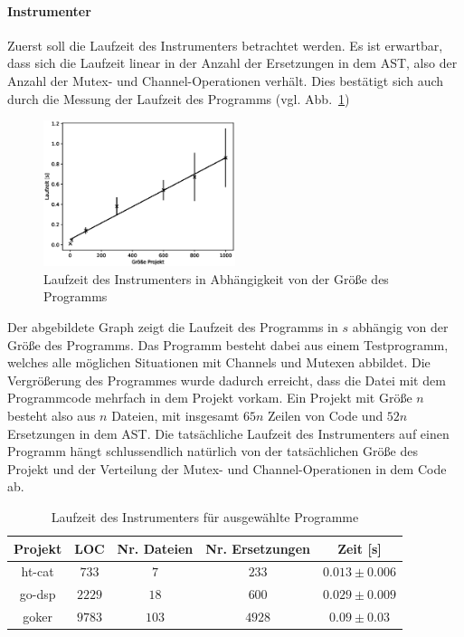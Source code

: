 \paragraph{Instrumenter} Zuerst soll die Laufzeit des Instrumenters betrachtet 
werden. Es ist erwartbar, 
dass sich die Laufzeit linear in der Anzahl der Ersetzungen in dem AST, also 
der Anzahl der Mutex- und Channel-Operationen verhält. Dies bestätigt sich auch durch 
die Messung der Laufzeit des Programms (vgl. 
Abb.~\ref{Chap:Tracer-Sec:Laufzeit-Img:LaufzeitTracer})
\begin{figure}[h!]
  \includegraphics[width=0.5\textwidth]{img/tracer/Runtime_Instrumenter.eps}
  \caption{Laufzeit des Instrumenters in Abhängigkeit von der Größe des 
  Programms}
  \label{Chap:Tracer-Sec:Laufzeit-Img:LaufzeitTracer}
\end{figure} 
Der abgebildete Graph zeigt die Laufzeit des Programms in $s$ abhängig von der 
Größe des Programms. Das Programm besteht dabei aus einem Testprogramm, welches 
alle möglichen Situationen mit Channels und Mutexen abbildet. Die Vergrößerung 
des Programmes wurde dadurch erreicht, dass die Datei mit dem Programmcode 
mehrfach in dem Projekt vorkam. Ein Projekt mit Größe $n$ besteht also 
aus $n$ Dateien, mit insgesamt $65n$ Zeilen von Code und $52n$ Ersetzungen
in dem AST. Die tatsächliche Laufzeit des Instrumenters auf einen 
Programm hängt schlussendlich natürlich von der tatsächlichen Größe des 
Projekt und der Verteilung der Mutex- und Channel-Operationen in dem Code ab.\\
\begin{table}[!h]
  \centering
  \begin{tabular}{|c|c|c|c|c|}
  \hline
  Projekt & LOC & Nr. Dateien & Nr. Ersetzungen & Zeit {[}s{]} \\ \hline
  ht-cat & $733$ & $7$ & $233$ & $0.013 \pm 0.006$ \\ \hline
  go-dsp & $2229$ & $18$ & $600$ & $0.029 \pm 0.009$ \\ \hline
  goker & $9783$ & $103$ & $4928$ & $0.09 \pm 0.03$ \\ \hline
  \end{tabular}
  \caption{Laufzeit des Instrumenters für ausgewählte Programme}
  \label{Chap:Tracer-Sec:Laufzeit-Tab:LaufzeitTracer}
\end{table}
